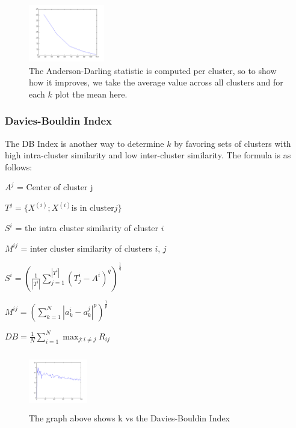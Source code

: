 \documentclass[conference]{IEEEtran}
\begin{document}
\begin{figure}
\centering
\includegraphics[width=1.3in,height=1in]{../poster/images/gmeans_k_vs_metric.png} 
\caption{The Anderson-Darling statistic is computed per cluster, so to
  show how it improves, we take the average value across all clusters and
  for each $k$ plot the mean here.}
\end{figure}


\subsubsection{Davies-Bouldin Index}
The DB Index is
another way to determine $k$ by favoring sets of clusters
with high intra-cluster similarity and low inter-cluster
similarity.  The formula is as follows:

$A^j$ = Center of cluster j

$T^j = \{ {X^{(i)} ; X^{(i)} \text{is in cluster} j} \}$

$S^i$ = the intra cluster similarity of cluster $i$

$M^{ij}$ = inter cluster similarity of clusters $i$, $j$

$S^i = (\frac{1}{|T^i|} \sum\limits_{j=1}^{|T^i|} (T^i_j -A^i)^q)^{\frac{1}{q}}$

$M^{ij} = (\sum\limits_{k=1}^{N} |a^i_k - a^j_k|^p)^{\frac{1}{p}}$

$DB = \frac{1}{N} \sum\limits_{i=1}^N \max_{j:i \neq j} R_{ij}$

\begin{figure}
\centering
\includegraphics[width=1in,height=1in]{../poster/images/davies_k_vs_davies_index.png}
\caption{The graph above shows k vs the Davies-Bouldin Index}
\end{figure}

\end{document}
